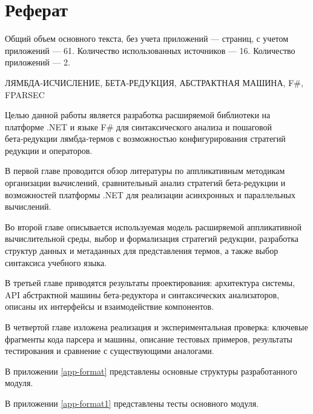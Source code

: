 \chapter*{Реферат}
\thispagestyle{plain}

Общий объем основного текста, без учета приложений — \pageref{end_of_main_text} страниц, с учетом приложений — 61. Количество использованных источников — 16. Количество приложений — 2.

\noindent \uppercase{лямбда-исчисление, бета‑редукция, абстрактная машина, F\#, FParsec}

Целью данной работы является разработка расширяемой библиотеки на платформе .NET и языке F\# для синтаксического анализа и пошаговой бета‑редукции лямбда‑термов с возможностью конфигурирования стратегий редукции и операторов.

В первой главе проводится обзор литературы по аппликативным методикам организации вычислений, сравнительный анализ стратегий бета‑редукции и возможностей платформы .NET для реализации асинхронных и параллельных вычислений.

Во второй главе описывается используемая модель расширяемой аппликативной вычислительной среды, выбор и формализация стратегий редукции, разработка структур данных и метаданных для представления термов, а также выбор синтаксиса учебного языка.

В третьей главе приводятся результаты проектирования: архитектура системы, API абстрактной машины бета‑редуктора и синтаксических анализаторов, описаны их интерфейсы и взаимодействие компонентов.

В четвертой главе изложена реализация и экспериментальная проверка: ключевые фрагменты кода парсера и машины, описание тестовых примеров, результаты тестирования и сравнение с существующими аналогами.

В приложении \ref{app-format} представлены основные структуры разработанного модуля.

В приложении \ref{app-format1} представлены тесты основного модуля.

